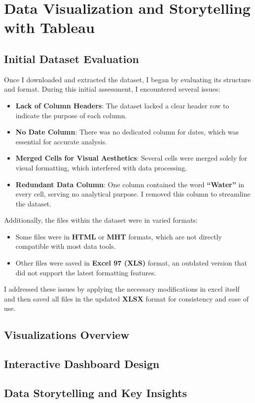 \chapter{Data Visualization and Storytelling with Tableau}
\label{chapter:Data Visualization and Storytelling with Tableau}

\section{Initial Dataset Evaluation}

Once I downloaded and extracted the dataset, I began by evaluating its structure and format. During this initial assessment, I encountered several issues:

\begin{itemize}
    \item \textbf{Lack of Column Headers}: The dataset lacked a clear header row to indicate the purpose of each column.
    \item \textbf{No Date Column}: There was no dedicated column for dates, which was essential for accurate analysis.
    \item \textbf{Merged Cells for Visual Aesthetics}: Several cells were merged solely for visual formatting, which interfered with data processing.
    \item \textbf{Redundant Data Column}: One column contained the word \textbf{“Water”} in every cell, serving no analytical purpose. I removed this column to streamline the dataset.
\end{itemize}

Additionally, the files within the dataset were in varied formats:

\begin{itemize}
    \item Some files were in \textbf{HTML} or \textbf{MHT} formats, which are not directly compatible with most data tools.
    \item Other files were saved in \textbf{Excel 97 (XLS)} format, an outdated version that did not support the latest formatting features.
\end{itemize}

I addressed these issues by applying the necessary modifications in excel itself and then saved all files in the updated \textbf{XLSX} format for consistency and ease of use.

\section{Visualizations Overview}

\section{Interactive Dashboard Design}

\section{Data Storytelling and Key Insights}